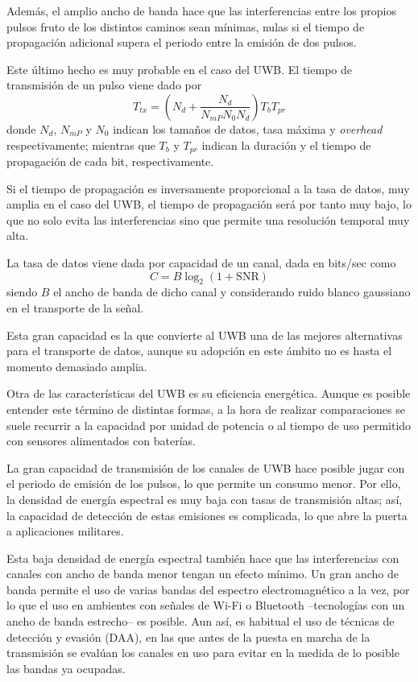 Además, el amplio ancho de banda hace que las interferencias entre los propios pulsos fruto de los distintos caminos sean mínimas, nulas si el tiempo de propagación adicional supera el periodo entre la emisión de dos pulsos.

Este último hecho es muy probable en el caso del UWB.
El tiempo de transmisión de un pulso viene dado por\cite{MAIN}
\begin{equation}
    T_{tx} = \left(N_d + \frac{N_d}{N_{mP}N_{0}N_d} \right) T_b T_{pr}
\end{equation}
donde $N_d$, $N_{mP}$ y $N_{0}$ indican los tamaños de datos, tasa máxima y \textit{overhead} respectivamente;
mientras que $T_b$ y $T_{pr}$ indican la duración y el tiempo de propagación de cada bit, respectivamente.

Si el tiempo de propagación es inversamente proporcional a la tasa de datos, muy amplia en el caso del UWB, el tiempo de propagación será por tanto muy bajo, lo que no solo evita las interferencias sino que permite una resolución temporal muy alta.

La tasa de datos viene dada por capacidad de un canal, dada en bits/sec como\cite{MAIN}
\begin{equation}
    C = B\log_2(1 + \text{SNR})
\end{equation}
siendo $B$ el ancho de banda de dicho canal y considerando ruido blanco gaussiano en el transporte de la señal.

Esta gran capacidad es la que convierte al UWB una de las mejores alternativas para el transporte de datos, aunque su adopción en este ámbito no es hasta el momento demasiado amplia.

Otra de las características del UWB es su eficiencia energética.
Aunque es posible entender este término de distintas formas, a la hora de realizar comparaciones se suele recurrir a la capacidad por unidad de potencia o al tiempo de uso permitido con sensores alimentados con baterías.

La gran capacidad de transmisión de los canales de UWB hace posible jugar con el periodo de emisión de los pulsos, lo que permite un consumo menor.
Por ello, la densidad de energía espectral es muy baja con tasas de transmisión altas; así, la capacidad de detección de estas emisiones es complicada, lo que abre la puerta a aplicaciones militares.

Esta baja densidad de energía espectral también hace que las interferencias con canales con ancho de banda menor tengan un efecto mínimo.
Un gran ancho de banda permite el uso de varias bandas del espectro electromagnético a la vez, por lo que el uso en ambientes con señales de Wi-Fi o Bluetooth --tecnologías con un ancho de banda estrecho-- es posible.
Aun así, es habitual el uso de técnicas de detección y evasión (DAA), en las que antes de la puesta en marcha de la transmisión se evalúan los canales en uso para evitar en la medida de lo posible las bandas ya ocupadas.

